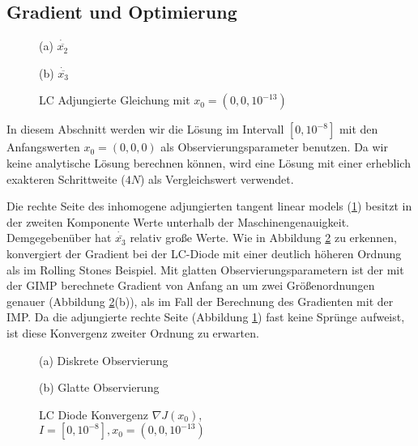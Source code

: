 \subsection{Gradient und Optimierung}
\begin{figure}[H]
\footnotesize
\begin{minipage}[b]{0.49\linewidth}
\centering

\caption*{(a) $\dot{\overline{x_2}}$}
\end{minipage}
\begin{minipage}[b]{0.49\linewidth}
\centering

\caption*{(b) $\dot{\overline{x_3}}$}
\end{minipage}
\caption{LC Adjungierte Gleichung mit $x_0=(0,0,10^{-13})$}
\label{fig:lcAdjointEqRHS}
\end{figure}
In diesem Abschnitt werden wir die Lösung im Intervall $[0,10^{-8}]$ mit den Anfangswerten $x_0=(0,0,0)$ als Observierungsparameter benutzen. Da wir keine analytische Lösung berechnen können, wird eine Lösung mit einer erheblich exakteren Schrittweite ($4N$) als Vergleichswert verwendet.

Die rechte Seite des inhomogene adjungierten tangent linear models (\ref{fig:lcAdjointEqRHS}) besitzt in der zweiten Komponente Werte unterhalb der Maschinengenauigkeit. Demgegebenüber hat $\dot{\bar{x_3}}$ relativ große Werte.
Wie in Abbildung \ref{fig:lcAdjointConvergence} zu erkennen, konvergiert der Gradient bei der LC-Diode mit einer deutlich höheren Ordnung als im Rolling Stones Beispiel. Mit glatten Observierungsparametern ist der mit der GIMP berechnete Gradient von Anfang an um zwei Größenordnungen genauer (Abbildung \ref{fig:lcAdjointConvergence}(b)), als im Fall der Berechnung des Gradienten mit der IMP. Da die adjungierte rechte Seite (Abbildung \ref{fig:lcAdjointEqRHS}) fast keine Sprünge aufweist, ist diese Konvergenz zweiter Ordnung zu erwarten.
\begin{figure}[H]
\footnotesize 
\centering
\begin{minipage}[b]{0.49\linewidth}

\caption*{(a) Diskrete Observierung}
\end{minipage}
\begin{minipage}[b]{0.49\linewidth}

\caption*{(b) Glatte Observierung}
\end{minipage}
\caption{LC Diode Konvergenz $\nabla J(x_0)$, \\$I=[0,10^{-8}],x_0=(0,0,10^{-13})$}
\label{fig:lcAdjointConvergence}
\end{figure}

